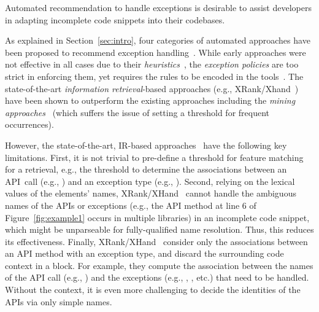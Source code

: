 \begin{Observation} 
\label{ob1}
Automated recommendation to handle exceptions is desirable to
assist developers in adapting incomplete code snippets into their
codebases.
\end{Observation}


As explained in Section~\ref{sec:intro},  four
categories of automated approaches have been proposed to recommend
exception
handling~\cite{xrank-fse20,barbosa-bsse12,chanchal-scam14,barbosa-tse18,barbosa-tse16}. While
early approaches were not effective in all cases due to their {\em
  heuristics}~\cite{barbosa-bsse12}, the {\em exception policies} are
too strict in enforcing them, yet requires the rules to be encoded in
the tools~\cite{barbosa-tse16,barbosa-saner18}. The state-of-the-art
{\em information retrieval}-based approaches (e.g.,
XRank/Xhand~\cite{xrank-fse20}) have been shown to outperform the
existing approaches including the {\em mining
  approaches}~\cite{chanchal-scam14} (which suffers the issue of setting a
threshold for frequent occurrences).


However, the state-of-the-art, IR-based approaches~\cite{xrank-fse20}
have the following key limitations. First, it is not trivial to
pre-define a threshold for feature matching for a retrieval, e.g., the
threshold to determine the associations between an API~call (e.g.,
) and an exception type (e.g.,
). Second, relying on the lexical
values of the elements' names, XRank/XHand~\cite{xrank-fse20} cannot
handle the ambiguous names of the APIs or exceptions (e.g., the API
method  at line 6 of Figure~\ref{fig:example1} occurs in
multiple libraries) in an incomplete code snippet, which might be
unparseable for fully-qualified name resolution. Thus, this reduces
its effectiveness. Finally, XRank/XHand~\cite{xrank-fse20} consider
only the associations between an API method with an exception type,
and discard the surrounding code context in a  block.
For example, they compute the association between the names of
the API call (e.g., ) and the exceptions
(e.g., , ,
etc.)  that need to be handled. Without the context, it is even more
challenging to decide the identities of the APIs via only simple
names.


